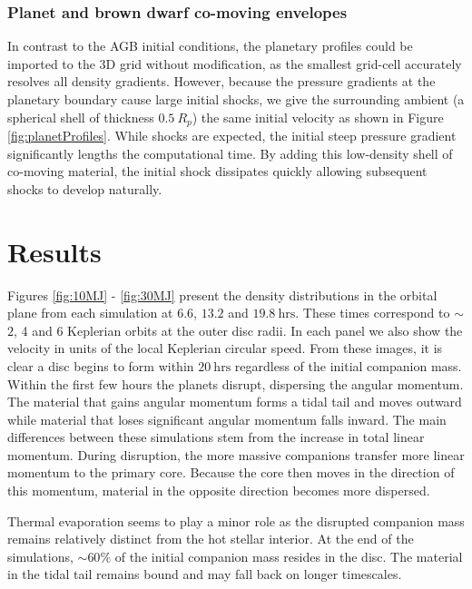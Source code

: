 \documentclass[fleqn,usenatbib]{mnras}
\begin{document}
\subsubsection{Planet and brown dwarf co-moving envelopes}

In contrast to the AGB initial conditions, the planetary profiles could be imported to the 3D grid without modification, as the smallest grid-cell accurately resolves all density gradients. However, because the pressure gradients at the planetary boundary cause large initial shocks, we give the surrounding ambient (a spherical shell of thickness $\mathrm{0.5}\ R_p$) the same initial velocity as shown in Figure \ref{fig:planetProfiles}. While shocks are expected, the initial steep pressure gradient significantly lengths the computational time.  By adding this low-density shell of co-moving material, the initial shock dissipates quickly allowing subsequent shocks to develop naturally. 

\section{Results}



Figures \ref{fig:10MJ} - \ref{fig:30MJ} present the density distributions in the orbital plane from each simulation at $6.6$, $13.2$ and $\mathrm{19.8\ hrs}$. These times correspond to $\sim$$2$, 4 and 6 Keplerian orbits at the outer disc radii. In each panel we also show the velocity in units of the local Keplerian circular speed. From these images, it is clear a disc begins to form within $\mathrm{20\ hrs}$ regardless of the initial companion mass. Within the first few hours the planets disrupt, dispersing the angular momentum. The material that gains angular momentum forms a tidal tail and moves outward while material that loses significant angular momentum falls inward. The main differences between these simulations stem from the increase in total linear momentum. During disruption, the more massive companions transfer more linear momentum to the primary core. Because the core then moves in the direction of this momentum, material in the opposite direction becomes more dispersed.

Thermal evaporation seems to play a minor role as the disrupted companion mass remains relatively distinct from the hot stellar interior.  At the end of the simulations, $\sim$$60\%$ of the initial companion mass resides in the disc.  The material in the tidal tail remains bound and may fall back on longer timescales.
\end{document}
